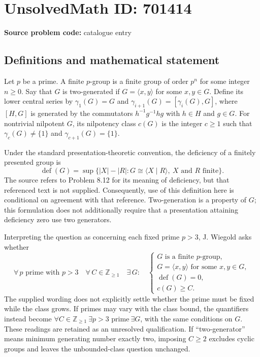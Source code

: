 \documentclass[11pt]{article}
\newcommand{\Z}{\mathbb{Z}}
\begin{document}
\section*{UnsolvedMath ID: 701414}
\textbf{Source problem code:} catalogue entry
\subsection{Definitions and mathematical statement}
Let \(p\) be a prime. A finite \(p\)-group is a finite group of order \(p^n\) for some integer \(n\geq 0\). Say that \(G\) is two-generated if \(G=\langle x,y\rangle\) for some \(x,y\in G\). Define its lower central series by \(\gamma_1(G)=G\) and \(\gamma_{i+1}(G)=[\gamma_i(G),G]\), where \([H,G]\) is generated by the commutators \(h^{-1}g^{-1}hg\) with \(h\in H\) and \(g\in G\). For nontrivial nilpotent \(G\), its nilpotency class \(c(G)\) is the integer \(c\geq 1\) such that \(\gamma_c(G)\neq\{1\}\) and \(\gamma_{c+1}(G)=\{1\}\).

Under the standard presentation-theoretic convention, the deficiency of a finitely presented group is
\[
\operatorname{def}(G)=\sup\bigl\{|X|-|R|:G\cong\langle X\mid R\rangle,\ X\text{ and }R\text{ finite}\bigr\}.
\]
The source refers to Problem 8.12 for its meaning of deficiency, but that referenced text is not supplied. Consequently, use of this definition here is conditional on agreement with that reference. Two-generation is a property of \(G\); this formulation does not additionally require that a presentation attaining deficiency zero use two generators.

Interpreting the question as concerning each fixed prime \(p>3\), J. Wiegold asks whether
\[
\forall\,p\text{ prime with }p>3\quad
\forall\,C\in\Z_{\geq 1}\quad
\exists\,G:\quad
\begin{cases}
G\text{ is a finite }p\text{-group},\\
G=\langle x,y\rangle\text{ for some }x,y\in G,\\
\operatorname{def}(G)=0,\\
c(G)\geq C.
\end{cases}
\]
The supplied wording does not explicitly settle whether the prime must be fixed while the class grows. If primes may vary with the class bound, the quantifiers instead become \(\forall C\in\Z_{\geq 1}\ \exists p>3\text{ prime}\ \exists G\), with the same conditions on \(G\). These readings are retained as an unresolved qualification. If ``two-generator'' means minimum generating number exactly two, imposing \(C\geq 2\) excludes cyclic groups and leaves the unbounded-class question unchanged.
\end{document}
